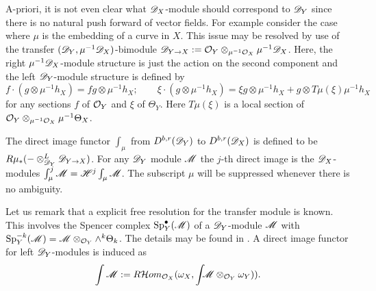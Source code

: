 A-priori, it is not even clear what $\mathscr{D}_X$-module should correspond to $\mathscr{D}_Y$ since there is no natural push forward of vector fields.
For example consider the case where $\mu$ is the embedding of a curve in $X$.
This issue may be resolved by use of the transfer $(\mathscr{D}_Y,\mu^{-1}\mathscr{D}_X)$-bimodule $\mathscr{D}_{Y\to X}:= \mathcal{O}_Y \otimes_{\mu^{-1}\mathcal{O}_X}\mu^{-1}\mathscr{D}_X$.
Here, the right $\mu^{-1}\mathscr{D}_X$-module structure is just the action on the second component and the left $\mathscr{D}_Y$-module structure is defined by
$$f\cdot (g\otimes \mu^{-1}h_X) = fg \otimes \mu^{-1}h_X; \qquad \xi\cdot (g\otimes\mu^{-1}h_X) = \xi g \otimes \mu^{-1}h_X + g \otimes T\mu(\xi)\mu^{-1}h_X $$
for any sections $f$ of $\mathcal{O}_Y$ and $\xi$ of $\Theta_Y$.
Here $T\mu(\xi)$ is a local section of $\mathcal{O}_Y\otimes_{\mu^{-1}\mathcal{O}_X} \mu^{-1}\Theta_X$.
\begin{definition}
  The direct image functor $\int_\mu$ from $D^{b,r}(\mathscr{D}_Y)$ to $D^{b,r}(\mathscr{D}_X)$ is defined to be $R\mu_* ({-}\otimes_{\mathscr{D}_Y}^L \mathscr{D}_{Y\to X})$.
  For any $\mathscr{D}_Y$ module $\mathscr{M}$ the $j$-th direct image is the $\mathscr{D}_X$-modules $\int_\mu^j \mathscr{M} = \mathscr{H}^j \int_\mu \mathscr{M}$.
  The subscript $\mu$ will be suppressed whenever there is no ambiguity.
\end{definition}
Let us remark that a explicit free resolution for the transfer module is known.
This involves the Spencer complex $\operatorname{Sp}_Y^\bullet(\mathscr{M})$ of a $\mathscr{D}_Y$-module $\mathscr{M}$ with $\operatorname{Sp}_Y^{-k}(\mathscr{M}) = \mathscr{M}\otimes_{\mathcal{O}_Y}\wedge^k \Theta_k$.
The details may be found in \cite{sabbah2011introduction}.
A direct image functor for left $\mathscr{D}_Y$-modules is induced as  $$\int\mathscr{M} := R\mathcal{H}om_{\mathcal{O}_X}(\omega_X,\int\mkern -8mu  \mathscr{M}\otimes_{\mathcal{O}_Y} \omega_Y)).$$

